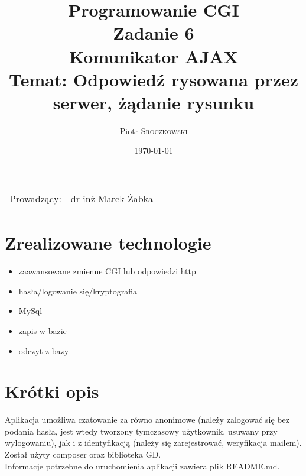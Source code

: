 \documentclass{article}
\title{Programowanie CGI \\ Zadanie 6 \\ Komunikator AJAX \\ Temat: Odpowiedź rysowana przez serwer, żądanie rysunku} %
\author{Piotr \textsc{Sroczkowski}} %
\date{\today} %
\begin{document}
\maketitle %

\begin{center}
\begin{tabular}{l r}
Prowadzący: & dr inż Marek Żabka %
\end{tabular}
\end{center}



\section{Zrealizowane technologie}
\begin{itemize}
\item zaawansowane zmienne CGI lub odpowiedzi http
\item hasła/logowanie się/kryptografia
\item MySql
\item zapis w bazie
\item odczyt z bazy
\end{itemize}

\section{Krótki opis}
Aplikacja umożliwa czatowanie za równo anonimowe (należy zalogować się bez podania hasła,
jest wtedy tworzony tymczasowy użytkownik, usuwany przy wylogowaniu), jak i z identyfikacją
(należy się zarejestrować, weryfikacja mailem).\\

Został użyty composer oraz biblioteka GD.\\
Informacje potrzebne do uruchomienia aplikacji zawiera plik README.md.
\end{document}
